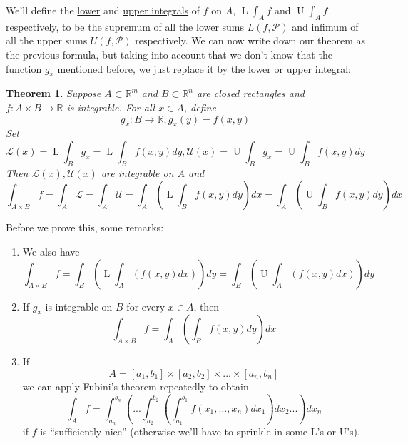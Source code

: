 \documentclass{article}
\newtheorem{theorem}{Theorem}
\newcommand{\reals}[0]{\mathbb{R}}
\newcommand{\mc}[1]{\mathcal{#1}}
\newcommand{\loint}[0]{\operatorname{L}\int}
\newcommand{\hiint}[0]{\operatorname{U}\int}
\begin{document}
We'll define the \underline{lower} and \underline{upper integrals} of \(f\) on \(A\), \(\loint_Af\) and \(\hiint_Af\) respectively, to be the supremum of all the lower sums \(L(f, \mc{P})\) and infimum of all the upper sums \(U(f, \mc{P})\) respectively. We can now write down our theorem as the previous formula, but taking into account that we don't know that the function \(g_x\) mentioned before, we just replace it by the lower or upper integral:
\begin{theorem}
  Suppose \(A \subset \reals^m\) and \(B \subset \reals^n\) are closed rectangles and \(f: A \times B \to \reals\) is integrable. For all \(x \in A\), define
  \begin{equation}
    g_x: B \to \reals, g_x(y) = f(x, y)
  \end{equation}
  Set
  \begin{equation}
    \mc{L}(x) = \loint_Bg_x = \loint_Bf(x, y)dy, \mc{U}(x) = \hiint_Bg_x = \hiint_Bf(x, y)dy
  \end{equation}
  Then \(\mc{L}(x), \mc{U}(x)\) are integrable on \(A\) and
  \begin{equation}
    \int_{A \times B}f = \int_A\mc{L} = \int_A\mc{U} = \int_A\left(\loint_Bf(x, y)dy\right)dx = \int_A\left(\hiint_Bf(x, y)dy\right)dx
  \end{equation}
\end{theorem}
Before we prove this, some remarks:
\begin{enumerate}

  \item We also have
  \begin{equation}
    \int_{A \times B}f = \int_B\left(\loint_A(f(x, y)dx)\right)dy = \int_B\left(\hiint_A(f(x, y)dx)\right)dy
  \end{equation}

  \item If \(g_x\) is integrable on \(B\) for every \(x \in A\), then
  \begin{equation}
    \int_{A \times B}f = \int_A\left(\int_Bf(x, y)dy\right)dx
  \end{equation}

  \item If
  \begin{equation}
    A = [a_1, b_1] \times [a_2, b_2] \times ... \times [a_n, b_n]
  \end{equation}
  we can apply Fubini's theorem repeatedly to obtain
  \begin{equation}
    \int_Af = \int_{a_n}^{b_n} \left(... \int_{a_2}^{b_2}\left(\int_{a_1}^{b_1}f(x_1,...,x_n)dx_1\right)dx_2...\right) dx_n
  \end{equation}
  if \(f\) is ``sufficiently nice'' (otherwise we'll have to sprinkle in some L's or U's).

\end{enumerate}
\end{document}
